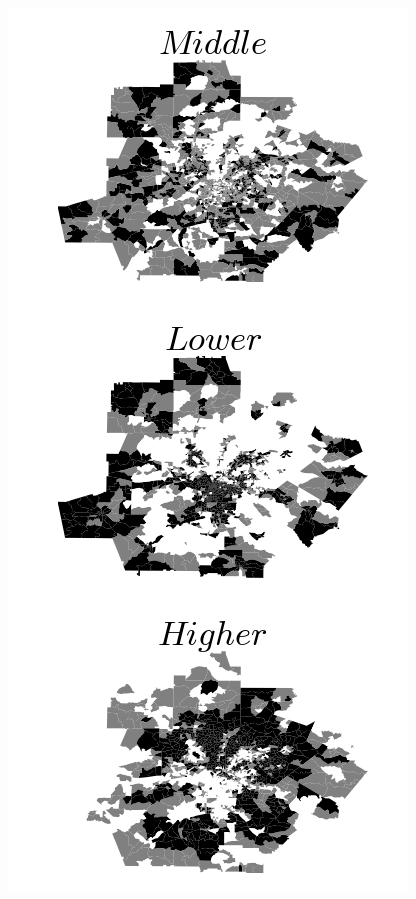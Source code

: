 \begin{figure}
    \centering
    \includegraphics[width=\textwidth]{./gfx/chapter-segregation/figure2.png}

\end{figure}
